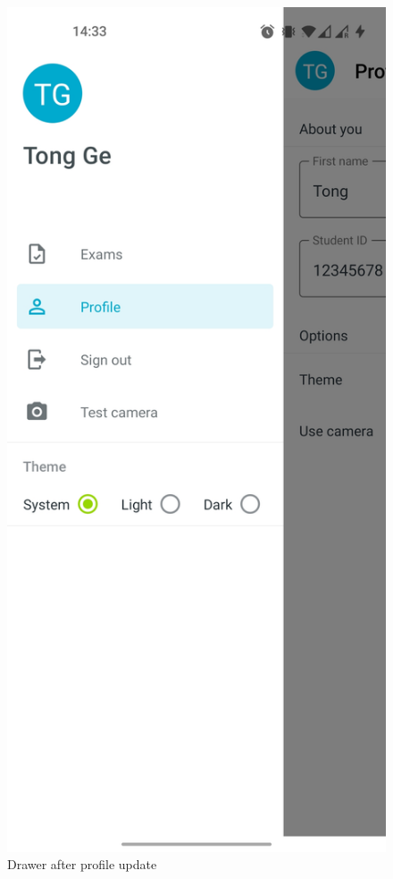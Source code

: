 \begin{minipage}{.5\textwidth}
\begin{figure}[H]
    \centering
    \includegraphics[width=\textwidth]{appendix/imgs/app-drawer1.jpg}
    \caption{Drawer after profile update}
    \label{fig:app-drawer1}
\end{figure}
\end{minipage}
